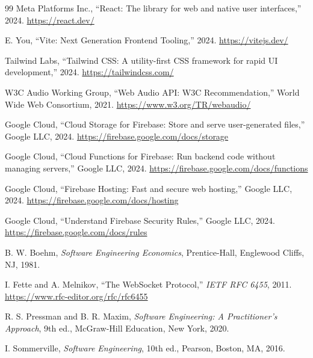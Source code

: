 \documentclass[12pt,a4paper,openany]{report}
\begin{document}
\begin{thebibliography}{99}
Meta Platforms Inc., ``React: The library for web and native user interfaces,'' 2024. \url{https://react.dev/}

E. You, ``Vite: Next Generation Frontend Tooling,'' 2024. \url{https://vitejs.dev/}

Tailwind Labs, ``Tailwind CSS: A utility-first CSS framework for rapid UI development,'' 2024. \url{https://tailwindcss.com/}

W3C Audio Working Group, ``Web Audio API: W3C Recommendation,'' World Wide Web Consortium, 2021. \url{https://www.w3.org/TR/webaudio/}

Google Cloud, ``Cloud Storage for Firebase: Store and serve user-generated files,'' Google LLC, 2024. \url{https://firebase.google.com/docs/storage}

Google Cloud, ``Cloud Functions for Firebase: Run backend code without managing servers,'' Google LLC, 2024. \url{https://firebase.google.com/docs/functions}

Google Cloud, ``Firebase Hosting: Fast and secure web hosting,'' Google LLC, 2024. \url{https://firebase.google.com/docs/hosting}

Google Cloud, ``Understand Firebase Security Rules,'' Google LLC, 2024. \url{https://firebase.google.com/docs/rules}

B. W. Boehm, \textit{Software Engineering Economics}, Prentice-Hall, Englewood Cliffs, NJ, 1981.

I. Fette and A. Melnikov, ``The WebSocket Protocol,'' \textit{IETF RFC 6455}, 2011. \url{https://www.rfc-editor.org/rfc/rfc6455}

R. S. Pressman and B. R. Maxim, \textit{Software Engineering: A Practitioner's Approach}, 9th ed., McGraw-Hill Education, New York, 2020.

I. Sommerville, \textit{Software Engineering}, 10th ed., Pearson, Boston, MA, 2016.

\end{thebibliography}
 
\end{document}
